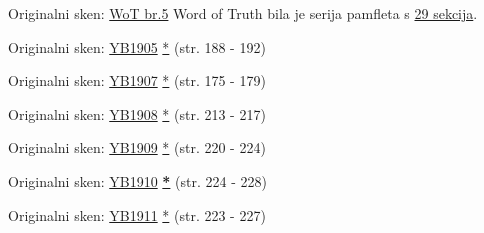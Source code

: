 
Originalni sken: \href{https://adl.b2.adventistdigitallibrary.org/concern/published_works/4ffda25e-a06b-48d4-8ace-67cdcd33726f}{WoT br.5}
Word of Truth bila je serija pamfleta s \href{https://adl.b2.adventistdigitallibrary.org/concern/parent/22267078_fundamental_principles_of_seventh_day_adventists/published_works/94a22141-33e8-4b9a-b397-2fe48c17bec4}{29 sekcija}.


Originalni sken: \href{https://documents.adventistarchives.org/Yearbooks/YB1905.pdf#search=Yearbook%201905}{YB1905} \href{https://forgotten-pillar.s3.us-east-2.amazonaws.com/YB1905.pdf}{*} (str. 188 - 192)


Originalni sken: \href{https://documents.adventistarchives.org/Yearbooks/YB1907.pdf#search=Yearbook%201906}{YB1907} \href{https://forgotten-pillar.s3.us-east-2.amazonaws.com/YB1907.pdf}{*} (str. 175 - 179)


Originalni sken: \href{https://documents.adventistarchives.org/Yearbooks/YB1908.pdf#search=Yearbook%201906}{YB1908} \href{https://forgotten-pillar.s3.us-east-2.amazonaws.com/YB1908.pdf}{*} (str. 213 - 217)


Originalni sken: \href{https://documents.adventistarchives.org/Yearbooks/YB1909.pdf#search=Yearbook%201909}{YB1909} \href{https://forgotten-pillar.s3.us-east-2.amazonaws.com/YB1909.pdf}{*} (str. 220 - 224)


Originalni sken: \href{https://documents.adventistarchives.org/Yearbooks/YB1910.pdf#search=Yearbook%201910}{YB1910} \textbf{\href{https://forgotten-pillar.s3.us-east-2.amazonaws.com/YB1910.pdf}{*}} (str. 224 - 228)


Originalni sken: \href{https://documents.adventistarchives.org/Yearbooks/YB1911.pdf#search=Yearbook%201910}{YB1911} \href{https://forgotten-pillar.s3.us-east-2.amazonaws.com/YB1911.pdf}{*} (str. 223 - 227)


